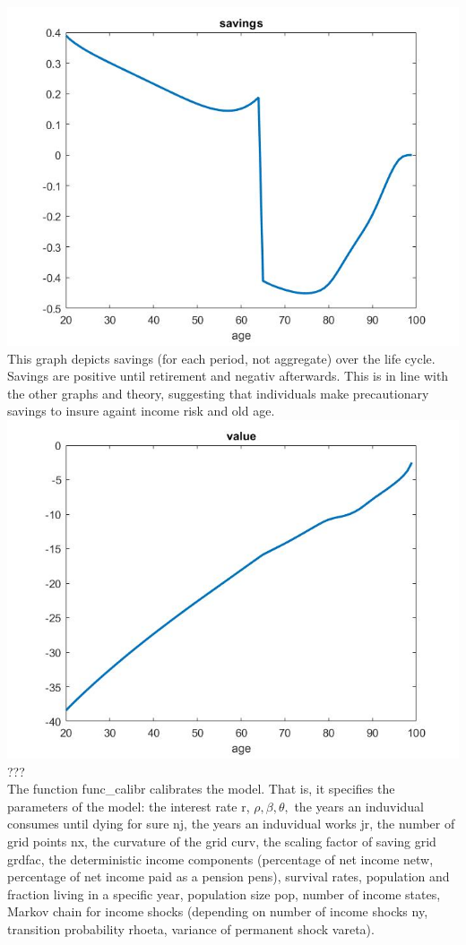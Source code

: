 \documentclass[12pt,a4paper]{article}
\begin{document}
\includegraphics[width=14cm]{Graphs/Figure12} \\
This graph depicts savings (for each period, not aggregate) over the life cycle. Savings are positive until retirement and negativ afterwards. This is in line with the other graphs and theory, suggesting that individuals make precautionary savings to insure againt income risk and old age.\\
\includegraphics[width=14cm]{Graphs/Figure13} \\
???\\


The function func\_calibr calibrates the model. That is, it specifies the parameters of the model: the interest rate r, $\rho, \beta, \theta,$ the years an induvidual consumes until dying for sure nj, the years an induvidual works jr, the number of grid points nx, the curvature of the grid curv, the scaling factor of saving grid grdfac, the deterministic income components (percentage of net income netw, percentage of net income paid as a pension pens), survival rates, population and fraction living in a specific year, population size pop, number of income states, Markov chain for income shocks (depending on number of income shocks ny, transition probability rhoeta, variance of permanent shock vareta).\\
\end{document}

